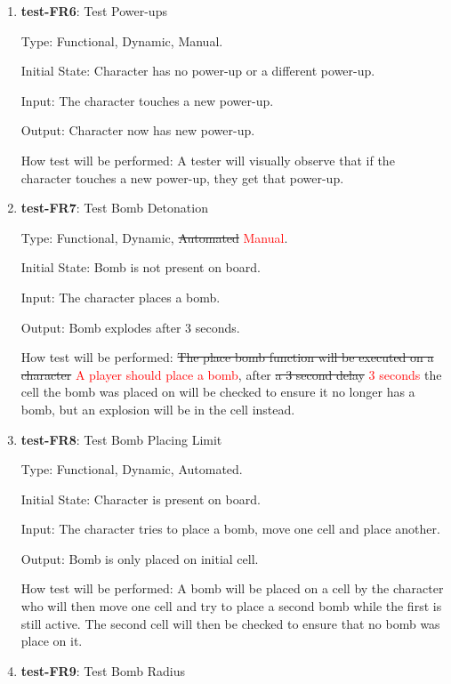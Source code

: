 \documentclass[12pt, titlepage]{article}
\begin{document}
\begin{enumerate}

\item{\textbf{test-FR6}: Test Power-ups\\}

Type: Functional, Dynamic, Manual.
					
Initial State: Character has no power-up or a different power-up.
					
Input: The character touches a new power-up.
					
Output: Character now has new power-up.
					
How test will be performed: A tester will visually observe that if the character touches a new power-up, they get that power-up.

\item{\textbf{test-FR7}: Test Bomb Detonation\\} 

Type: Functional, Dynamic, \st{Automated} \textcolor{red}{Manual}.
					
Initial State: Bomb is not present on board.
					
Input: The character places a bomb.
					
Output: Bomb explodes after 3 seconds.
					
How test will be performed: \st{The place bomb function will be executed on a character} \textcolor{red}{A player should place a bomb}, after \st{a 3 second delay} \textcolor{red}{3 seconds} the cell the bomb was placed on will be checked to ensure it no longer has a bomb, but an explosion will be in the cell instead.

\item{\textbf{test-FR8}: Test Bomb Placing Limit\\}

Type: Functional, Dynamic, Automated.
					
Initial State: Character is present on board.
					
Input: The character tries to place a bomb, move one cell and place another.
					
Output: Bomb is only placed on initial cell.
					
How test will be performed: A bomb will be placed on a cell by the character who will then move one cell and try to place a second bomb while the first is still active. The second cell will then be checked to ensure that no bomb was place on it.

\item{\textbf{test-FR9}: Test Bomb Radius\\} 


\end{enumerate}
\end{document}
